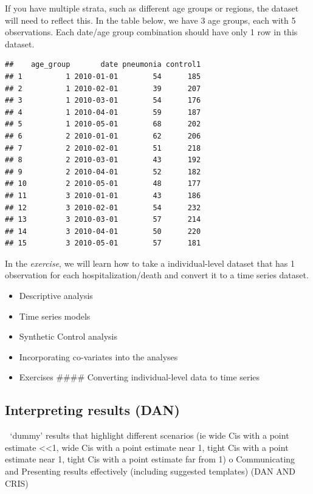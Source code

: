\documentclass[]{article}
\providecommand{\tightlist}{%
  \setlength{\itemsep}{0pt}\setlength{\parskip}{0pt}}
\begin{document}
If you have multiple strata, such as different age groups or regions,
the dataset will need to reflect this. In the table below, we have 3 age
groups, each with 5 observations. Each date/age group combination should
have only 1 row in this dataset.

\begin{verbatim}
##    age_group       date pneumonia control1
## 1          1 2010-01-01        54      185
## 2          1 2010-02-01        39      207
## 3          1 2010-03-01        54      176
## 4          1 2010-04-01        59      187
## 5          1 2010-05-01        68      202
## 6          2 2010-01-01        62      206
## 7          2 2010-02-01        51      218
## 8          2 2010-03-01        43      192
## 9          2 2010-04-01        52      182
## 10         2 2010-05-01        48      177
## 11         3 2010-01-01        43      186
## 12         3 2010-02-01        54      232
## 13         3 2010-03-01        57      214
## 14         3 2010-04-01        50      220
## 15         3 2010-05-01        57      181
\end{verbatim}

In the \emph{exercise}, we will learn how to take a individual-level
dataset that has 1 observation for each hospitalization/death and
convert it to a time series dataset.

\begin{itemize}
\tightlist
\item
  Descriptive analysis
\item
  Time series models
\item
  Synthetic Control analysis
\item
  Incorporating co-variates into the analyses
\item
  Exercises \#\#\#\# Converting individual-level data to time series
\end{itemize}

\subsection{Interpreting results (DAN)}\label{interpreting-results-dan}

 `dummy' results that highlight different scenarios (ie wide Cis with a
point estimate \textless{}\textless{}1, wide Cis with a point estimate
near 1, tight Cis with a point estimate near 1, tight Cis with a point
estimate far from 1) o Communicating and Presenting results effectively
(including suggested templates) (DAN AND CRIS)
\end{document}
